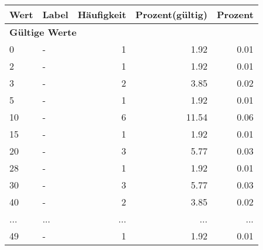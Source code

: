      \begin{longtable}{lXrrr}
     \toprule
     \textbf{Wert} & \textbf{Label} & \textbf{Häufigkeit} & \textbf{Prozent(gültig)} & \textbf{Prozent} \\
     \endhead
     \midrule
     \multicolumn{5}{l}{\textbf{Gültige Werte}}\\
        0 & \multicolumn{1}{X}{-} & %
          \num{1} &
          \num[round-mode=places,round-precision=2]{1,92} &
          \num[round-mode=places,round-precision=2]{0,01} \\
        2 & \multicolumn{1}{X}{-} & %
          \num{1} &
          \num[round-mode=places,round-precision=2]{1,92} &
          \num[round-mode=places,round-precision=2]{0,01} \\
        3 & \multicolumn{1}{X}{-} & %
          \num{2} &
          \num[round-mode=places,round-precision=2]{3,85} &
          \num[round-mode=places,round-precision=2]{0,02} \\
        5 & \multicolumn{1}{X}{-} & %
          \num{1} &
          \num[round-mode=places,round-precision=2]{1,92} &
          \num[round-mode=places,round-precision=2]{0,01} \\
        10 & \multicolumn{1}{X}{-} & %
          \num{6} &
          \num[round-mode=places,round-precision=2]{11,54} &
          \num[round-mode=places,round-precision=2]{0,06} \\
        15 & \multicolumn{1}{X}{-} & %
          \num{1} &
          \num[round-mode=places,round-precision=2]{1,92} &
          \num[round-mode=places,round-precision=2]{0,01} \\
        20 & \multicolumn{1}{X}{-} & %
          \num{3} &
          \num[round-mode=places,round-precision=2]{5,77} &
          \num[round-mode=places,round-precision=2]{0,03} \\
        28 & \multicolumn{1}{X}{-} & %
          \num{1} &
          \num[round-mode=places,round-precision=2]{1,92} &
          \num[round-mode=places,round-precision=2]{0,01} \\
        30 & \multicolumn{1}{X}{-} & %
          \num{3} &
          \num[round-mode=places,round-precision=2]{5,77} &
          \num[round-mode=places,round-precision=2]{0,03} \\
        40 & \multicolumn{1}{X}{-} & %
          \num{2} &
          \num[round-mode=places,round-precision=2]{3,85} &
          \num[round-mode=places,round-precision=2]{0,02} \\
       ... & ... & ... & ... & ... \\
        49 & \multicolumn{1}{X}{-} & %
          \num{1} &
          \num[round-mode=places,round-precision=2]{1,92} &
          \num[round-mode=places,round-precision=2]{0,01} \\


\end{longtable}
